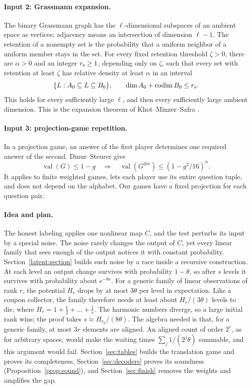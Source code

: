 \documentclass[11pt]{article}
\newcommand{\val}{\operatorname{val}}
\begin{document}
\paragraph{Input 2: Grassmann expansion.}
The binary Grassmann graph has the $\ell$-dimensional subspaces of an
ambient space as vertices; adjacency means an intersection of dimension
$\ell-1$. The retention of a nonempty set is the probability that a uniform
neighbor of a uniform member stays in the set. For every fixed retention
threshold $\zeta>0$, there are $\alpha>0$ and an integer $r_{\rm s}\ge1$, depending
only on $\zeta$, such that every set with retention at least $\zeta$ has
relative density at least $\alpha$ in an interval
\[
 \{L:A_0\subseteq L\subseteq B_0\},
 \qquad \dim A_0+\operatorname{codim}B_0\le r_{\rm s}.
\]
This holds for every sufficiently large $\ell$, and then every sufficiently
large ambient dimension. This is the expansion theorem of
Khot--Minzer--Safra \cite[Theorem 1.12]{KMS}.

\paragraph{Input 3: projection-game repetition.}
In a projection game, an answer of the first player determines one required
answer of the second. Dinur--Steurer \cite[Corollary 1.2]{DS} give
\begin{equation}\label{eq:repetition}
 \val(G)\le1-g\quad\Longrightarrow\quad
 \val(G^{\otimes n})\le(1-g^2/16)^n.
\end{equation}
It applies to finite weighted games, lets each player use its entire
question tuple, and does not depend on the alphabet. Our games have a
fixed projection for each question pair.

\paragraph{Idea and plan.}
The honest labeling applies one nonlinear map $C$, and the test perturbs
its input by a special noise. The noise rarely changes the output of $C$,
yet every linear family that sees enough of the output notices it with
constant probability. Section~\ref{latent:section} builds such noise by a
race inside a recursive construction. At each level an output change
survives with probability $1-\theta$, so after $s$ levels it survives with
probability about $e^{-\theta s}$. For a generic family of linear
observations of rank $r$, the potential $H_r$ drops by at most $3\theta$ per
level in expectation. Like a coupon collector, the family therefore needs
at least about $H_r/(3\theta)$ levels to die, where
$H_r=1+\frac12+\dots+\frac1r$. The harmonic numbers diverge, so a large
initial rank wins; the proof takes $s\approx H_{r_0}/(8\theta)$. The algebra
needed is that, for a generic family, at most $3r$ elements are aligned.
An aligned count of order $2^r$, as for arbitrary spaces, would make the
waiting times $\sum_j1/(2^j\theta)$ summable, and this argument would fail.
Section~\ref{sec:tables} builds the translation game and proves its
completeness, Section~\ref{sec:decoders} proves its soundness
(Proposition~\ref{prop:sound}), and Section~\ref{sec:finish} removes the
weights and amplifies the gap.
\end{document}
